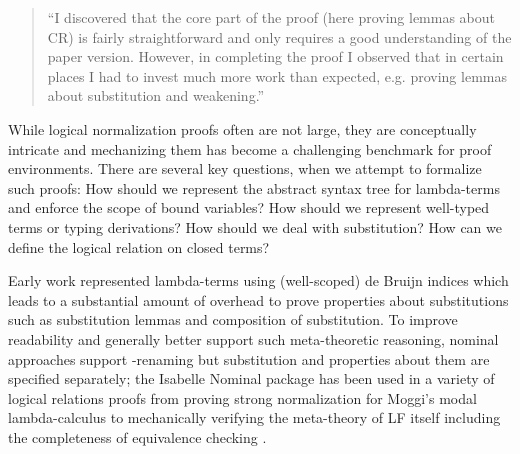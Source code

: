 \documentclass[copyright,creativecommons]{eptcs}
\begin{document}
\begin{quote}
``I discovered that the core part of the proof (here proving lemmas about CR) is fairly straightforward and only requires a good understanding of the paper version. However, in completing the proof I observed that in certain places I had to invest much more work than expected, e.g. proving lemmas about substitution and weakening.'' 
\end{quote}

While logical normalization proofs often are not large, they are conceptually intricate and mechanizing them has become a challenging benchmark for proof environments. There are several key questions, when we attempt to formalize such proofs: How should we represent the abstract syntax tree for lambda-terms and enforce the scope of bound variables? How should we represent well-typed terms or typing derivations? How should we deal with substitution? How can we define the logical relation on closed terms? 

Early work \cite{Berardi:WLF90,CCoquand:92,Altenkirch:TLCA93} represented lambda-terms using (well-scoped) de Bruijn indices which leads to a substantial amount of overhead to prove properties about substitutions such as substitution lemmas and composition of substitution. To improve readability and generally better support such meta-theoretic reasoning, nominal approaches support -renaming but substitution and properties about them are specified separately; the Isabelle Nominal package has been used in a variety of logical relations proofs from proving strong normalization for Moggi's modal lambda-calculus \citep{Doczkal:LFMTP09} to mechanically verifying the meta-theory of LF itself including the completeness of equivalence checking \citep{Narboux:LFMTP08,Urban:TOCL11}. 
\end{document}
